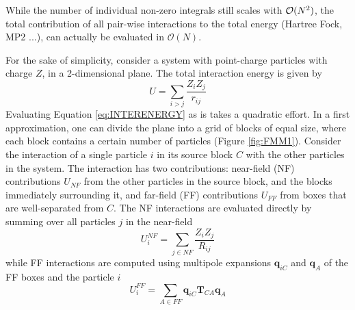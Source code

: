 While the number of individual non-zero integrals still scales with $\mathcal{O}(N^{2})$, the total contribution of all pair-wise interactions to the total energy (Hartree Fock, MP2 ...), can actually be evaluated in $\mathcal{O}(N)$.

For the sake of simplicity, consider a system with point-charge particles with charge $Z$, in a 2-dimensional plane. The total interaction energy is given by
\begin{equation}
U = \sum_{i>j} \frac{Z_i Z_j}{r_{ij}}
\label{eq:INTERENERGY}
\end{equation}
\noindent Evaluating Equation \ref{eq:INTERENERGY} as is takes a quadratic effort. In a first approximation, one can divide the plane into a grid of blocks of equal size, where each block contains a certain number of particles (Figure \ref{fig:FMM1}). Consider the interaction of a single particle $i$ in its source block $C$ with the other particles in the system. The interaction has two contributions: near-field (NF) contributions $U_{NF}$ from the other particles in the source block, and the blocks immediately surrounding it, and far-field (FF) contributions $U_{FF}$ from boxes that are well-separated from $C$. The NF interactions are evaluated directly by summing over all particles $j$ in the near-field
\begin{equation}
U^{NF}_i = \sum_{j \in NF} \frac{Z_i Z_j}{R_{ij}}
\end{equation}
\noindent while FF interactions are computed using multipole expansions $\mathbf{q}_{iC}$ and $\mathbf{q}_A$ of the FF boxes and the particle $i$
\begin{equation}
U^{FF}_i = \sum_{A \in FF} \mathbf{q}_{iC} \mathbf{T}_{CA} \mathbf{q}_A
\end{equation}

